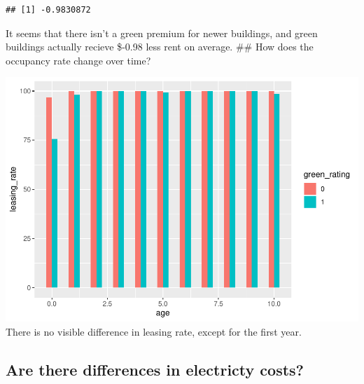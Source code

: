 \documentclass[]{article}
\newenvironment{Shaded}{\begin{snugshade}}{\end{snugshade}}
\newcommand{\DataTypeTok}[1]{\textcolor[rgb]{0.13,0.29,0.53}{#1}}
\newcommand{\DecValTok}[1]{\textcolor[rgb]{0.00,0.00,0.81}{#1}}
\newcommand{\FloatTok}[1]{\textcolor[rgb]{0.00,0.00,0.81}{#1}}
\newcommand{\KeywordTok}[1]{\textcolor[rgb]{0.13,0.29,0.53}{\textbf{#1}}}
\newcommand{\NormalTok}[1]{#1}
\newcommand{\OperatorTok}[1]{\textcolor[rgb]{0.81,0.36,0.00}{\textbf{#1}}}
\newcommand{\StringTok}[1]{\textcolor[rgb]{0.31,0.60,0.02}{#1}}
\begin{document}
\begin{verbatim}
## [1] -0.9830872
\end{verbatim}

It seems that there isn't a green premium for newer buildings, and green
buildings actually recieve \$-0.98 less rent on average. \#\# How does
the occupancy rate change over time?

\begin{Shaded}
\end{Shaded}

\includegraphics{STA380_exercise_George_files/figure-latex/unnamed-chunk-4-1.pdf}
There is no visible difference in leasing rate, except for the first
year.

\hypertarget{are-there-differences-in-electricty-costs}{%
\subsection{\texorpdfstring{Are there differences in electricty costs?
}{Are there differences in electricty costs?  }}\label{are-there-differences-in-electricty-costs}}
\end{document}
